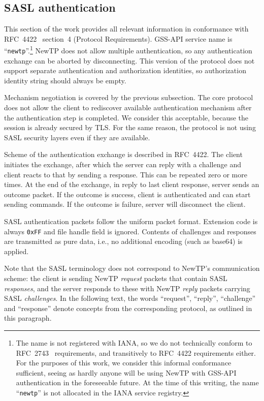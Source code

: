 %

\subsection{SASL authentication}

This section of the work provides all relevant information in conformance with RFC~4422~\cite{rfc4422}
section~4 (Protocol Requirements). GSS-API service name is ``{\tt newtp}''.\footnote{The name is not
registered with IANA, so we do not technically conform to RFC~2743~\cite{rfc2743} requirements, and
transitively to RFC~4422 requirements either. For the purposes of this work, we consider this informal
conformance sufficient, seeing as hardly anyone will be using NewTP with GSS-API authentication in the
foreseeable future. At the time of this writing, the name ``{\tt newtp}'' is not allocated in the IANA service
registry.} NewTP does not allow multiple authentication, so any authentication exchange can be aborted by
disconnecting. This version of the protocol does not support separate authentication and authorization
identities, so authorization identity string should always be empty.

Mechanism negotiation is covered by the previous subsection. The core protocol does not allow the client to
rediscover available authentication mechanism after the authentication step is completed. We consider this
acceptable, because the session is already secured by TLS. For the same reason, the protocol is not using SASL
security layers even if they are available.

Scheme of the authentication exchange is described in RFC~4422. The client initiates the exchange, after which
the server can reply with a challenge and client reacts to that by sending a response. This can be repeated
zero or more times. At the end of the exchange, in reply to last client response, server sends an outcome
packet.  If the outcome is success, client is authenticated and can start sending commands. If the outcome is
failure, server will disconnect the client.

SASL authentication packets follow the uniform packet format. Extension code is always {\tt 0xFF} and file
handle field is ignored. Contents of challenges and responses are transmitted as pure data, i.e., no
additional encoding (such as base64) is applied.

Note that the SASL terminology does not correspond to NewTP's communication scheme: the client is sending
NewTP {\it request} packets that contain SASL {\it responses}, and the server responds to these with NewTP
{\it reply} packets carrying SASL {\it challenges}. In the following text, the words ``request'', ``reply'',
``challenge'' and ``response'' denote concepts from the corresponding protocol, as outlined in this paragraph.


